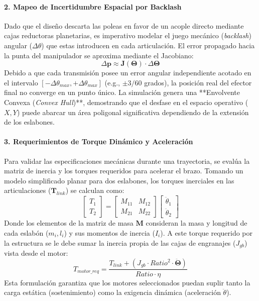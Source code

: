 \documentclass[12pt, a4paper]{article}
\begin{document}
\paragraph{2. Mapeo de Incertidumbre Espacial por Backlash}
Dado que el diseño descarta las poleas en favor de un acople directo mediante cajas reductoras planetarias, es imperativo modelar el juego mecánico (\textit{backlash}) angular ($\Delta\theta$) que estas introducen en cada articulación.
El error propagado hacia la punta del manipulador se aproxima mediante el Jacobiano:
\begin{equation}
    \Delta\mathbf{p} \approx \mathbf{J}(\mathbf{\Theta}) \cdot \Delta\mathbf{\Theta}
\end{equation}
Debido a que cada transmisión posee un error angular independiente acotado en el intervalo $[-\Delta\theta_{max}, +\Delta\theta_{max}]$ (e.g., $\pm 3/60$ grados), la posición real del efector final no converge en un punto único. La simulación genera una **Envolvente Convexa (\textit{Convex Hull})**, demostrando que el desfase en el espacio operativo ($X,Y$) puede abarcar un área poligonal significativa dependiendo de la extensión de los eslabones.

\paragraph{3. Requerimientos de Torque Dinámico y Aceleración}
Para validar las especificaciones mecánicas durante una trayectoria, se evalúa la matriz de inercia y los torques requeridos para acelerar el brazo. Tomando un modelo simplificado planar para dos eslabones, los torques inerciales en las articulaciones ($\mathbf{T}_{link}$) se calculan como:
\begin{equation}
    \begin{bmatrix} T_{1} \\ T_{2} \end{bmatrix} = 
    \begin{bmatrix} M_{11} & M_{12} \\ M_{21} & M_{22} \end{bmatrix} 
    \begin{bmatrix} \ddot{\theta}_1 \\ \ddot{\theta}_2 \end{bmatrix}
\end{equation}
Donde los elementos de la matriz de masa $\mathbf{M}$ consideran la masa y longitud de cada eslabón ($m_i, l_i$) y sus momentos de inercia ($I_i$). A este torque requerido por la estructura se le debe sumar la inercia propia de las cajas de engranajes ($J_{gb}$) vista desde el motor:
\begin{equation}
    T_{motor\_req} = \frac{T_{link} + (J_{gb} \cdot Ratio^2 \cdot \mathbf{\ddot{\Theta}})}{Ratio \cdot \eta}
\end{equation}
Esta formulación garantiza que los motores seleccionados puedan suplir tanto la carga estática (sostenimiento) como la exigencia dinámica (aceleración $\ddot{\theta}$).
\end{document}
